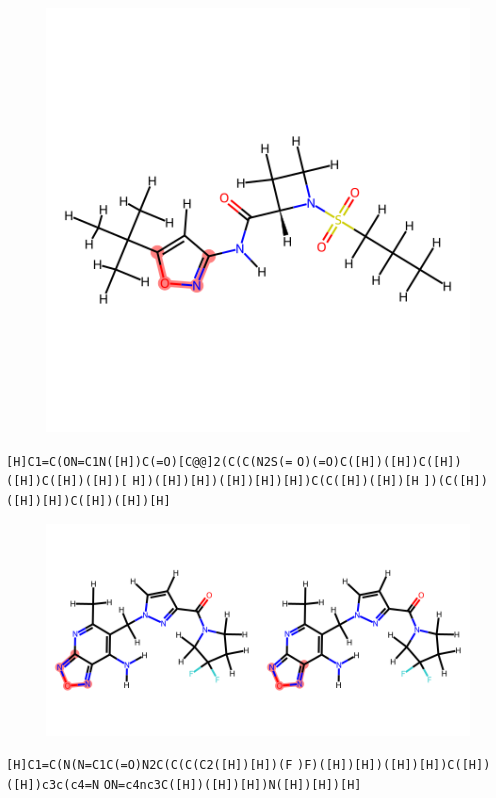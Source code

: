 \documentclass{article}
\begin{document}
\begin{figure}[ht]
\centering
    \includegraphics{mol114.png}
\end{figure}
\verb|[H]C1=C(ON=C1N([H])C(=O)[C@@]2(C(C(N2S(=| \verb|O)(=O)C([H])([H])C([H])([H])C([H])([H])[| \verb|H])([H])[H])([H])[H])[H])C(C([H])([H])[H| \verb|])(C([H])([H])[H])C([H])([H])[H]|

\begin{figure}[ht]
\centering
    \includegraphics{mol115.png}
\end{figure}
\verb|[H]C1=C(N(N=C1C(=O)N2C(C(C(C2([H])[H])(F| \verb|)F)([H])[H])([H])[H])C([H])([H])c3c(c4=N| \verb|ON=c4nc3C([H])([H])[H])N([H])[H])[H]|
\end{document}
